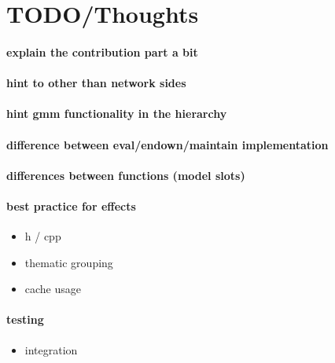 \documentclass{tufte-handout}
\newcommand\sourcelinkF[2]{\href{../#1/#2}{\mbox{#1/}\mbox{#2}}}
\begin{document}

\section{TODO/Thoughts}

\paragraph{explain the contribution part a bit}

\paragraph{hint to other than network sides}

\paragraph{hint gmm functionality in the hierarchy}

\paragraph{difference between eval/endown/maintain implementation}

\paragraph{differences between functions (model slots)}

\paragraph{best practice for effects}

\begin{itemize}
  \item h / cpp
  \item thematic grouping
  \item cache usage
\end{itemize}

\paragraph{testing}

\begin{itemize}
  \item integration
\end{itemize}
\end{document}
